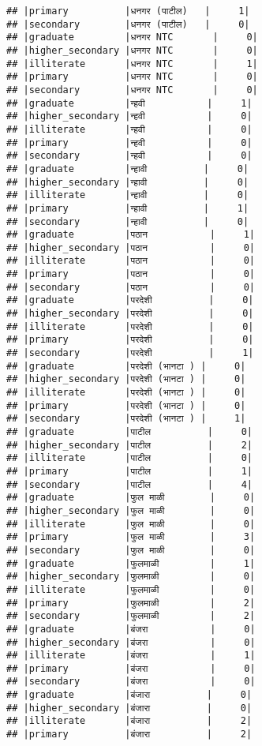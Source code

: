 \documentclass[
]{article}
\begin{document}
\begin{verbatim}
## |primary          |धनगर (पाटील)   |     1|
## |secondary        |धनगर (पाटील)   |     0|
## |graduate         |धनगर NTC       |     0|
## |higher_secondary |धनगर NTC       |     0|
## |illiterate       |धनगर NTC       |     1|
## |primary          |धनगर NTC       |     0|
## |secondary        |धनगर NTC       |     0|
## |graduate         |न्हवी           |     1|
## |higher_secondary |न्हवी           |     0|
## |illiterate       |न्हवी           |     0|
## |primary          |न्हवी           |     0|
## |secondary        |न्हवी           |     0|
## |graduate         |न्हावी          |     0|
## |higher_secondary |न्हावी          |     0|
## |illiterate       |न्हावी          |     0|
## |primary          |न्हावी          |     1|
## |secondary        |न्हावी          |     0|
## |graduate         |पठान           |     1|
## |higher_secondary |पठान           |     0|
## |illiterate       |पठान           |     0|
## |primary          |पठान           |     0|
## |secondary        |पठान           |     0|
## |graduate         |परदेशी          |     0|
## |higher_secondary |परदेशी          |     0|
## |illiterate       |परदेशी          |     0|
## |primary          |परदेशी          |     0|
## |secondary        |परदेशी          |     1|
## |graduate         |परदेशी (भानटा ) |     0|
## |higher_secondary |परदेशी (भानटा ) |     0|
## |illiterate       |परदेशी (भानटा ) |     0|
## |primary          |परदेशी (भानटा ) |     0|
## |secondary        |परदेशी (भानटा ) |     1|
## |graduate         |पाटील          |     0|
## |higher_secondary |पाटील          |     2|
## |illiterate       |पाटील          |     0|
## |primary          |पाटील          |     1|
## |secondary        |पाटील          |     4|
## |graduate         |फुल माळी        |     0|
## |higher_secondary |फुल माळी        |     0|
## |illiterate       |फुल माळी        |     0|
## |primary          |फुल माळी        |     3|
## |secondary        |फुल माळी        |     0|
## |graduate         |फुलमाळी         |     1|
## |higher_secondary |फुलमाळी         |     0|
## |illiterate       |फुलमाळी         |     0|
## |primary          |फुलमाळी         |     2|
## |secondary        |फुलमाळी         |     2|
## |graduate         |बंजरा           |     0|
## |higher_secondary |बंजरा           |     0|
## |illiterate       |बंजरा           |     1|
## |primary          |बंजरा           |     0|
## |secondary        |बंजरा           |     0|
## |graduate         |बंजारा          |     0|
## |higher_secondary |बंजारा          |     0|
## |illiterate       |बंजारा          |     2|
## |primary          |बंजारा          |     2|

\end{verbatim}
\end{document}
